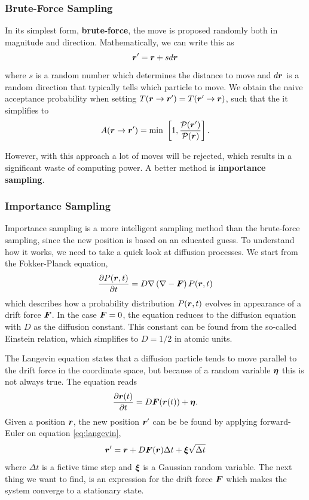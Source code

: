 \subsubsection{Brute-Force Sampling}
In its simplest form, \textbf{brute-force}, the move is proposed randomly both in magnitude and direction. Mathematically, we can write this as
\begin{equation}
\boldsymbol{{r}}'=\boldsymbol{{r}}+sd\boldsymbol{{r}}
\end{equation}
where $s$ is a random number which determines the distance to move and $d\boldsymbol{{r}}$ is a random direction that typically tells which particle to move. We obtain the naive acceptance probability when setting $T(\boldsymbol{{r}}\rightarrow\boldsymbol{{r}}')=T(\boldsymbol{{r}}'\rightarrow\boldsymbol{{r}})$, such that the it simplifies to
\begin{equation}
A(\boldsymbol{{r}}\rightarrow\boldsymbol{{r}}')=\text{min }\left[1,\frac{\mathcal{P}(\boldsymbol{{r}}')}{\mathcal{P}(\boldsymbol{{r}})}\right].
\end{equation}

However, with this approach a lot of moves will be rejected, which results in a significant waste of computing power. A better method is \textbf{importance sampling}.

\subsubsection{Importance Sampling}
Importance sampling is a more intelligent sampling method than the brute-force sampling, since the new position is based on an educated guess. To understand how it works, we need to take a quick look at diffusion processes. We start from the Fokker-Planck equation,
\begin{equation}
\frac{\partial P(\boldsymbol{{r}},t)}{\partial t}=D\nabla\left(\nabla-\boldsymbol{{F}}\right)P(\boldsymbol{{r}},t)
\end{equation}
which describes how a probability distribution $P(\boldsymbol{{r}},t)$ evolves in appearance of a drift force $\boldsymbol{{F}}$. In the case $\boldsymbol{{F}}=0$, the equation reduces to the diffusion equation with $D$ as the diffusion constant. This constant can be found from the so-called Einstein relation, which simplifies to $D=1/2$ in atomic units. 

The Langevin equation states that a diffusion particle tends to move parallel to the drift force in the coordinate space, but because of a random variable $\boldsymbol{{\eta}}$ this is not always true. The equation reads
\begin{equation}
\frac{\partial \boldsymbol{{r}}(t)}{\partial t}=D\boldsymbol{{F}}(\boldsymbol{{r}}(t))+\boldsymbol{{\eta}}.
\label{eq:langevin}
\end{equation}
Given a position $\boldsymbol{{r}}$, the new position $\boldsymbol{{r}}'$ can be be found by applying forward-Euler on equation \eqref{eq:langevin},
\begin{equation}
\boldsymbol{{r}}'=\boldsymbol{{r}}+D\boldsymbol{{F}}(\boldsymbol{{r}})\Delta t + \boldsymbol{{\xi}}\sqrt{\Delta t}
\end{equation}
where $\Delta t$ is a fictive time step and $\boldsymbol{{\xi}}$ is a Gaussian random variable. The next thing we want to find, is an expression for the drift force $\boldsymbol{{F}}$ which makes the system converge to a stationary state. 

